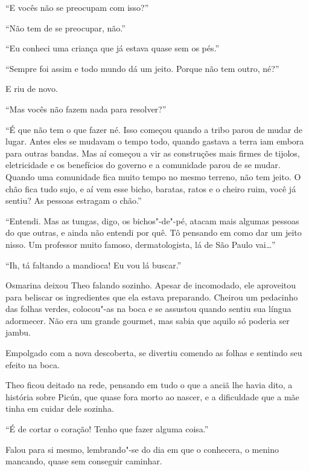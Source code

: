 ``E vocês não se preocupam com isso?''

``Não tem de se preocupar, não.''

``Eu conheci uma criança que já estava quase sem os pés.''

``Sempre foi assim e todo mundo dá um jeito. Porque não tem outro, né?''

E riu de novo.

``Mas vocês não fazem nada para resolver?''

``É que não tem o que fazer né. Isso começou quando a tribo parou de
mudar de lugar. Antes eles se mudavam o tempo todo, quando gastava a
terra iam embora para outras bandas. Mas aí começou a vir as construções
mais firmes de tijolos, eletricidade e os benefícios do governo e a
comunidade parou de se mudar. Quando uma comunidade fica muito tempo no
mesmo terreno, não tem jeito. O chão fica tudo sujo, e aí vem esse
bicho, baratas, ratos e o cheiro ruim, você já sentiu? As pessoas
estragam o chão.''

``Entendi. Mas as tungas, digo, os bichos"-de"-pé, atacam mais algumas
pessoas do que outras, e ainda não entendi por quê. Tô pensando em como dar um
jeito nisso. Um professor muito famoso, dermatologista, lá de São Paulo
vai\ldots{}''

``Ih, tá faltando a mandioca! Eu vou lá buscar.''

Osmarina deixou Theo falando sozinho. Apesar de incomodado, ele
aproveitou para beliscar os ingredientes que ela estava preparando.
Cheirou um pedacinho das folhas verdes, colocou"-as na boca e se assustou
quando sentiu sua língua adormecer. Não era um grande gourmet, mas sabia
que aquilo só poderia ser jambu.

Empolgado com a nova descoberta, se divertiu comendo as folhas e
sentindo seu efeito na boca.

\asterisc


Theo ficou deitado na rede, pensando em tudo o que a anciã lhe havia
dito, a história sobre Picún, que quase fora morto ao nascer, e a
dificuldade que a mãe tinha em cuidar dele sozinha.

``É de cortar o coração! Tenho que fazer alguma coisa.''

Falou para si mesmo, lembrando"-se do dia em que o conhecera, o menino
mancando, quase sem conseguir caminhar.

